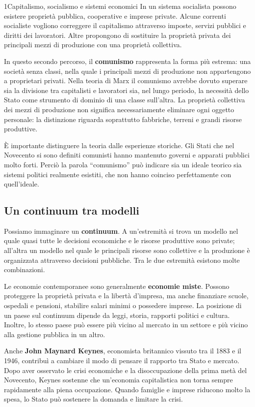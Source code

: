 \begin{lettura}{1}{Capitalismo, socialismo e sistemi economici}
In un sistema socialista possono esistere proprietà pubblica, cooperative e imprese private. Alcune correnti socialiste vogliono correggere il capitalismo attraverso imposte, servizi pubblici e diritti dei lavoratori. Altre propongono di sostituire la proprietà privata dei principali mezzi di produzione con una proprietà collettiva.

In questo secondo percorso, il \textbf{comunismo} rappresenta la forma più estrema: una società senza classi, nella quale i principali mezzi di produzione non appartengono a proprietari privati. Nella teoria di Marx il comunismo avrebbe dovuto superare sia la divisione tra capitalisti e lavoratori sia, nel lungo periodo, la necessità dello Stato come strumento di dominio di una classe sull'altra. La proprietà collettiva dei mezzi di produzione non significa necessariamente eliminare ogni oggetto personale: la distinzione riguarda soprattutto fabbriche, terreni e grandi risorse produttive.

È importante distinguere la teoria dalle esperienze storiche. Gli Stati che nel Novecento si sono definiti comunisti hanno mantenuto governi e apparati pubblici molto forti. Perciò la parola ``comunismo'' può indicare sia un ideale teorico sia sistemi politici realmente esistiti, che non hanno coinciso perfettamente con quell'ideale.

\subsection*{Un continuum tra modelli}
Possiamo immaginare un \textbf{continuum}. A un'estremità si trova un modello nel quale quasi tutte le decisioni economiche e le risorse produttive sono private; all'altra un modello nel quale le principali risorse sono collettive e la produzione è organizzata attraverso decisioni pubbliche. Tra le due estremità esistono molte combinazioni.

Le economie contemporanee sono generalmente \textbf{economie miste}. Possono proteggere la proprietà privata e la libertà d'impresa, ma anche finanziare scuole, ospedali e pensioni, stabilire salari minimi o possedere imprese. La posizione di un paese sul continuum dipende da leggi, storia, rapporti politici e cultura. Inoltre, lo stesso paese può essere più vicino al mercato in un settore e più vicino alla gestione pubblica in un altro.

Anche \textbf{John Maynard Keynes}, economista britannico vissuto tra il 1883 e il 1946, contribuì a cambiare il modo di pensare il rapporto tra Stato e mercato. Dopo aver osservato le crisi economiche e la disoccupazione della prima metà del Novecento, Keynes sostenne che un'economia capitalistica non torna sempre rapidamente alla piena occupazione. Quando famiglie e imprese riducono molto la spesa, lo Stato può sostenere la domanda e limitare la crisi.


\end{lettura}
